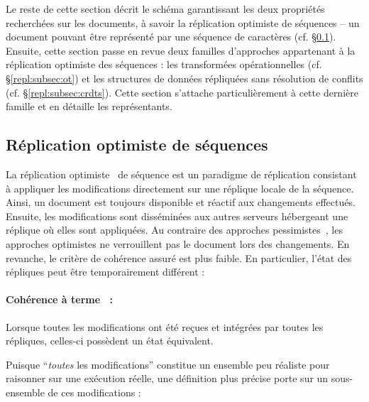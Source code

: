 Le reste de cette section décrit le schéma garantissant les deux propriétés
recherchées sur les documents, à savoir la réplication optimiste de séquences --
un document pouvant être représenté par une séquence de caractères
(cf. §\ref{repl:subsec:optimistic}).  Ensuite, cette section passe en revue deux
familles d'approches appartenant à la réplication optimiste des séquences : les
transformées opérationnelles (cf. §\ref{repl:subsec:ot}) et les structures de
données répliquées sans résolution de conflits
(cf. §\ref{repl:subsec:crdts}). Cette section s'attache particulièrement à cette
dernière famille et en détaille les représentants.

\subsection{Réplication optimiste de séquences}
\label{repl:subsec:optimistic}


La réplication optimiste~\cite{demers1987epidemic, johnson1975maintenance,
  ladin1992providing, saito2005optimistic} de séquence est un paradigme de
réplication consistant à appliquer les modifications directement sur une
réplique locale de la séquence.  Ainsi, un document est toujours disponible et
réactif aux changements effectués. Ensuite, les modifications sont disséminées
aux autres serveurs hébergeant une réplique où elles sont appliquées. Au
contraire des approches pessimistes~\cite{alsberg1976principle,
  gifford1979weighted}, les approches optimistes ne verrouillent pas le document
lors des changements. En revanche, le critère de cohérence assuré est plus
faible. En particulier, l'état des répliques peut être temporairement différent
:


\paragraph{Cohérence à terme~\cite{bailis2013eventual} :} Lorsque toutes les
modifications ont été reçues et intégrées par toutes les répliques, celles-ci
possèdent un état équivalent.

\noindent Puisque ``\emph{toutes} les modifications'' constitue un ensemble peu
réaliste pour raisonner sur une exécution réelle, une définition plus précise
porte sur un sous-ensemble de ces modifications :

